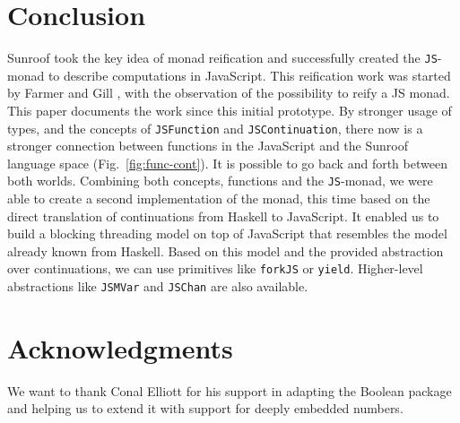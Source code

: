 \documentclass{llncs}
\newcommand{\Src}[1]{{\tt{#1}}}
\newcommand{\JS}{\Src{JS}}
\newcommand{\FigRef}[1]{Fig.~\ref{#1}}
\begin{document}
 
\section{Conclusion}

Sunroof took the key idea of monad reification and
successfully created the \JS-monad to describe computations
in JavaScript. This reification work was started by Farmer and
Gill \cite{Farmer:12:WebDSLs}, with the observation
of the possibility to reify a JS monad.
This paper documents the work since this initial prototype.
By stronger usage of types, and the concepts
of \Src{JSFunction} and \Src{JSContinuation}, there now is a 
stronger connection between
functions in the JavaScript and the Sunroof language space 
(\FigRef{fig:func-cont}). It is possible to go back and forth between 
both worlds. Combining both concepts, functions and the \JS-monad,
we were able to create a second implementation of the monad, this
time based on the direct translation of continuations from Haskell
to JavaScript. It enabled us to build a blocking threading model
on top of JavaScript that resembles the model already known from Haskell.
Based on this model and the provided abstraction over continuations,
we can use primitives like \Src{forkJS} or \Src{yield}.
Higher-level abstractions like \Src{JSMVar} and \Src{JSChan} are also
available. 

%

\section{Acknowledgments}

We want to thank Conal Elliott for his support in adapting 
the Boolean package \cite{project:boolean} and helping us to
extend it with support for deeply embedded numbers.

%
%


\vspace{-0.5cm} %
\end{document}
